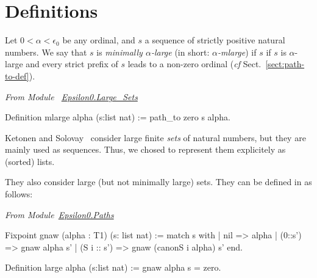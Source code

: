 \documentclass[a4paper]{book}
\begin{document}
\section{Definitions}


\begin{definition}
Let $0<\alpha<\epsilon_0$ be any ordinal, and $s$ a sequence of strictly positive natural numbers. 
We say that $s$ is \emph{minimally $\alpha$-large} (in short:
\emph{$\alpha$-mlarge}) if $s$ if $s$ is $\alpha$-large 
 and every strict prefix of $s$ leads to a non-zero ordinal (\emph{cf} Sect.~\vref{sect:path-to-def}).


\end{definition}

\vspace{4pt}

\noindent
\emph{From Module~ \href{../src/html/hydras.Epsilon0.Large_Sets.html\#mlarge}{Epsilon0.Large\_Sets}}


\begin{Coqsrc}
Definition mlarge alpha (s:list nat) := path_to zero s alpha.
\end{Coqsrc}



\begin{remark}
  Ketonen and Solovay~\cite{KS81} consider  large finite \emph{sets} of natural numbers,  but they are mainly used as sequences. Thus, we chosed to represent them explicitely as (sorted) lists. 

They also consider large (but not minimally large) sets. They can be defined in
\coq{} as follows:


\noindent
\emph{From Module~\href{../src/html/hydras.Epsilon0.Paths.html\#gnaw}{Epsilon0.Paths}}

\begin{Coqsrc}
Fixpoint gnaw (alpha : T1) (s: list nat) :=
  match s with
    | nil => alpha
    | (0::s') => gnaw  alpha s'
    | (S i :: s')  =>  gnaw (canonS i alpha) s'
  end.

Definition large alpha (s:list nat) := gnaw alpha s = zero.
\end{Coqsrc}
\end{remark}
\end{document}

